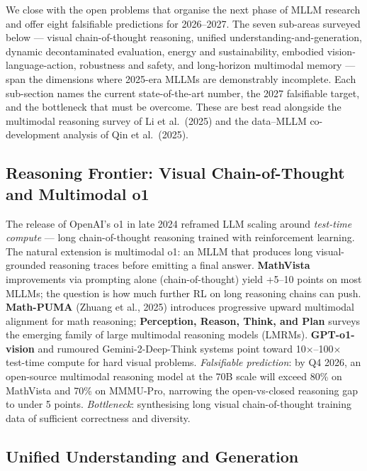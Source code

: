 \documentclass{article}
\begin{document}
We close with the open problems that organise the next phase of MLLM research and offer eight falsifiable predictions for 2026--2027. The seven sub-areas surveyed below --- visual chain-of-thought reasoning, unified understanding-and-generation, dynamic decontaminated evaluation, energy and sustainability, embodied vision-language-action, robustness and safety, and long-horizon multimodal memory --- span the dimensions where 2025-era MLLMs are demonstrably incomplete. Each sub-section names the current state-of-the-art number, the 2027 falsifiable target, and the bottleneck that must be overcome. These are best read alongside the multimodal reasoning survey of Li et al.~(2025) and the data--MLLM co-development analysis of Qin et al.~(2025).

\subsection{Reasoning Frontier: Visual Chain-of-Thought and Multimodal o1}\label{reasoning-frontier-visual-chain-of-thought-and-multimodal-o1}

The release of OpenAI's o1 in late 2024 reframed LLM scaling around \emph{test-time compute} --- long chain-of-thought reasoning trained with reinforcement learning. The natural extension is multimodal o1: an MLLM that produces long visual-grounded reasoning traces before emitting a final answer. \textbf{MathVista} improvements via prompting alone (chain-of-thought) yield +5--10 points on most MLLMs; the question is how much further RL on long reasoning chains can push. \textbf{Math-PUMA} (Zhuang et al., 2025) introduces progressive upward multimodal alignment for math reasoning; \textbf{Perception, Reason, Think, and Plan} \citep{li20252025} surveys the emerging family of large multimodal reasoning models (LMRMs). \textbf{GPT-o1-vision} and rumoured Gemini-2-Deep-Think systems point toward 10×--100× test-time compute for hard visual problems. \emph{Falsifiable prediction}: by Q4 2026, an open-source multimodal reasoning model at the 70B scale will exceed 80\% on MathVista and 70\% on MMMU-Pro, narrowing the open-vs-closed reasoning gap to under 5 points. \emph{Bottleneck}: synthesising long visual chain-of-thought training data of sufficient correctness and diversity.

\subsection{Unified Understanding and Generation}\label{unified-understanding-and-generation}
\end{document}
